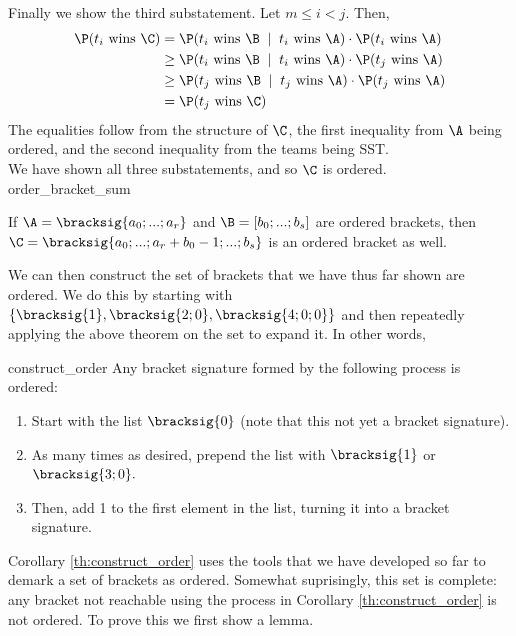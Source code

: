 {{Finally we show the third substatement. Let $m \leq i < j.$ Then,
\begin{align*}
    \P(t_i \textrm{ wins }\C) &= \P(t_i \textrm{ wins }\B \;\mid\; t_i \textrm{ wins } \A)\cdot \P(t_i \textrm{ wins } \A)\\
    &\geq \P(t_i \textrm{ wins }\B \;\mid\; t_i \textrm{ wins } \A)\cdot \P(t_j \textrm{ wins } \A)\\
    &\geq \P(t_j \textrm{ wins }\B \;\mid\; t_j \textrm{ wins } \A)\cdot \P(t_j \textrm{ wins } \A)\\
    &= \P(t_j \textrm{ wins }\C)
\end{align*}
The equalities follow from the structure of $\C$, the first inequality from $\A$ being ordered, and the second inequality from the teams being SST.\\

We have shown all three substatements, and so $\C$ is ordered.
}{order_bracket_sum}

\begin{corollary}{}{}
    If $\A = \bracksig{a_0; ...; a_r}$ and $\B = [b_0; ...; b_s]$ are ordered brackets, then $\C = \bracksig{a_0; ...; a_r + b_0 - 1; ...; b_s}$ is an ordered bracket as well.
\end{corollary}

We can then construct the set of brackets that we have thus far shown are ordered. We do this by starting with $\{\bracksig{1}, \bracksig{2; 0}, \bracksig{4; 0; 0}\}$ and then repeatedly applying the above theorem on the set to expand it. In other words,

\begin{corollary}{}{construct_order}
    Any bracket signature formed by the following process is ordered:
    \begin{enumerate}
        \item Start with the list $\bracksig{0}$ (note that this not yet a bracket signature).
        \item As many times as desired, prepend the list with $\bracksig{1}$ or $\bracksig{3; 0}.$
        \item Then, add 1 to the first element in the list, turning it into a bracket signature.
    \end{enumerate}
\end{corollary}

Corollary \ref{th:construct_order} uses the tools that we have developed so far to demark a set of brackets as ordered. Somewhat suprisingly, this set is complete: any bracket not reachable using the process in Corollary \ref{th:construct_order} is not ordered. To prove this we first show a lemma.

}
